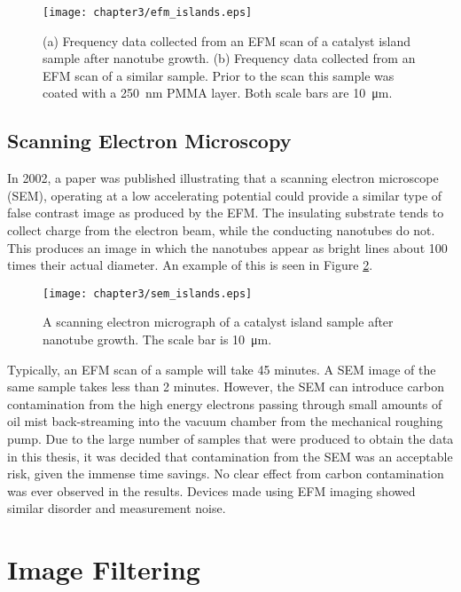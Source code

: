 \begin{figure}
	\centering
	\texttt{[image: chapter3/efm\_islands.eps]}
	\caption{(a) Frequency data collected from an EFM scan of a catalyst island sample after nanotube growth. (b) Frequency data collected from an EFM scan of a similar sample. Prior to the scan this sample was coated with a \SI{250}{\nano\meter} PMMA layer. Both scale bars are \SI{10}{\micro\meter}. }
	\label{fig:efm_islands}
\end{figure}

\subsection{Scanning Electron Microscopy}
\label{subsec:imaging_sem}

In 2002, a paper \cite{Brintlinger2002} was published illustrating that a scanning electron microscope (SEM), operating at a low accelerating potential could provide a similar type of false contrast image as produced by the EFM. The insulating substrate tends to collect charge from the electron beam, while the conducting nanotubes do not. This produces an image in which the nanotubes appear as bright lines about 100 times their actual diameter. An example of this is seen in Figure \ref{fig:sem_islands}. 

\begin{figure}
	\centering
	\texttt{[image: chapter3/sem\_islands.eps]}
	\caption{A scanning electron micrograph of a catalyst island sample after nanotube growth. The scale bar is \SI{10}{\micro\meter}.}
	\label{fig:sem_islands}
\end{figure}

Typically, an EFM scan of a sample will take 45 minutes. A SEM image of the same sample takes less than 2 minutes. However, the SEM can introduce carbon contamination from the high energy electrons passing through small amounts of oil mist back-streaming into the vacuum chamber from the mechanical roughing pump. Due to the large number of samples that were produced to obtain the data in this thesis, it was decided that contamination from the SEM was an acceptable risk, given the immense time savings. No clear effect from carbon contamination was ever observed in the results. Devices made using EFM imaging showed similar disorder and measurement noise.

\section{Image Filtering}

